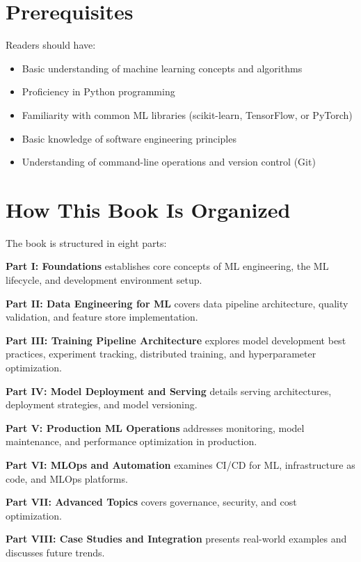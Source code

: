 \section*{Prerequisites}

Readers should have:

\begin{itemize}
    \item Basic understanding of machine learning concepts and algorithms
    \item Proficiency in Python programming
    \item Familiarity with common ML libraries (scikit-learn, TensorFlow, or PyTorch)
    \item Basic knowledge of software engineering principles
    \item Understanding of command-line operations and version control (Git)
\end{itemize}

\section*{How This Book Is Organized}

The book is structured in eight parts:

\textbf{Part I: Foundations} establishes core concepts of ML engineering, the ML lifecycle, and development environment setup.

\textbf{Part II: Data Engineering for ML} covers data pipeline architecture, quality validation, and feature store implementation.

\textbf{Part III: Training Pipeline Architecture} explores model development best practices, experiment tracking, distributed training, and hyperparameter optimization.

\textbf{Part IV: Model Deployment and Serving} details serving architectures, deployment strategies, and model versioning.

\textbf{Part V: Production ML Operations} addresses monitoring, model maintenance, and performance optimization in production.

\textbf{Part VI: MLOps and Automation} examines CI/CD for ML, infrastructure as code, and MLOps platforms.

\textbf{Part VII: Advanced Topics} covers governance, security, and cost optimization.

\textbf{Part VIII: Case Studies and Integration} presents real-world examples and discusses future trends.

